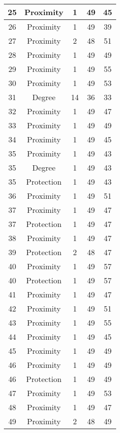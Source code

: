 \documentclass[results.tex]{subfiles}
\begin{document}
\begin{center}
\begin{tabular}{| c || c | c | c | c |}
    \hline
    25 & Proximity & 1 & 49 & 45 \\ 
    \hline
    26 & Proximity & 1 & 49 & 39 \\ 
    \hline
    27 & Proximity & 2 & 48 & 51 \\ 
    \hline
    28 & Proximity & 1 & 49 & 49 \\ 
    \hline
    29 & Proximity & 1 & 49 & 55 \\ 
    \hline
    30 & Proximity & 1 & 49 & 53 \\ 
    \hline
    31 & Degree & 14 & 36 & 33 \\ 
    \hline
    32 & Proximity & 1 & 49 & 47 \\ 
    \hline
    33 & Proximity & 1 & 49 & 49 \\ 
    \hline
    34 & Proximity & 1 & 49 & 45 \\ 
    \hline
    35 & Proximity & 1 & 49 & 43 \\ 
    \hline
    35 & Degree & 1 & 49 & 43 \\ 
    \hline
    35 & Protection & 1 & 49 & 43 \\ 
    \hline
    36 & Proximity & 1 & 49 & 51 \\ 
    \hline
    37 & Proximity & 1 & 49 & 47 \\ 
    \hline
    37 & Protection & 1 & 49 & 47 \\ 
    \hline
    38 & Proximity & 1 & 49 & 47 \\ 
    \hline
    39 & Protection & 2 & 48 & 47 \\ 
    \hline
    40 & Proximity & 1 & 49 & 57 \\ 
    \hline
    40 & Protection & 1 & 49 & 57 \\ 
    \hline
    41 & Proximity & 1 & 49 & 47 \\ 
    \hline
    42 & Proximity & 1 & 49 & 51 \\ 
    \hline
    43 & Proximity & 1 & 49 & 55 \\ 
    \hline
    44 & Proximity & 1 & 49 & 45 \\ 
    \hline
    45 & Proximity & 1 & 49 & 49 \\ 
    \hline
    46 & Proximity & 1 & 49 & 49 \\ 
    \hline
    46 & Protection & 1 & 49 & 49 \\ 
    \hline
    47 & Proximity & 1 & 49 & 53 \\ 
    \hline
    48 & Proximity & 1 & 49 & 47 \\ 
    \hline
    49 & Proximity & 2 & 48 & 49 \\ 
    \hline   \end{tabular}
\end{center}
\end{document}
